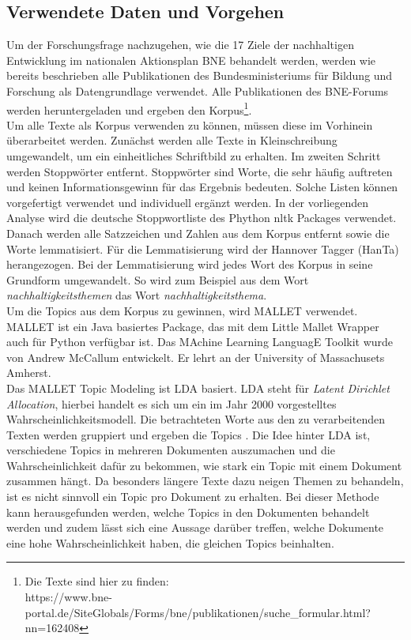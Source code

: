 \documentclass[letterpaper]{article}
\begin{document}
\subsection{Verwendete Daten und Vorgehen}
Um der Forschungsfrage nachzugehen, wie die 17 Ziele der nachhaltigen Entwicklung im nationalen Aktionsplan BNE behandelt werden, werden wie bereits beschrieben alle Publikationen des Bundesministeriums für Bildung und Forschung als Datengrundlage verwendet. Alle Publikationen des BNE-Forums werden heruntergeladen und ergeben den Korpus\footnote{Die Texte sind hier zu finden: \\ https://www.bne-portal.de/SiteGlobals/Forms/bne/publikationen/suche\_formular.html?nn=162408}.\\
Um alle Texte als Korpus verwenden zu können, müssen diese im Vorhinein überarbeitet werden. Zunächst werden alle Texte in Kleinschreibung umgewandelt, um ein einheitliches Schriftbild zu erhalten. Im zweiten Schritt werden Stoppwörter entfernt. Stoppwörter sind Worte, die sehr häufig auftreten und keinen Informationsgewinn für das Ergebnis bedeuten. Solche Listen können vorgefertigt verwendet und individuell ergänzt werden. In der vorliegenden Analyse wird die deutsche Stoppwortliste des Phython nltk Packages verwendet. 
Danach werden alle Satzzeichen und Zahlen aus dem Korpus entfernt sowie die Worte lemmatisiert. Für die Lemmatisierung wird der Hannover Tagger (HanTa)\cite{HanTa} herangezogen. Bei der Lemmatisierung wird jedes Wort des Korpus in seine Grundform umgewandelt. So wird zum Beispiel aus dem Wort \textit{nachhaltigkeitsthemen} das Wort \textit{nachhaltigkeitsthema}.\\
Um die Topics aus dem Korpus zu gewinnen, wird MALLET verwendet. MALLET ist ein Java basiertes Package, das mit dem Little Mallet Wrapper auch für Python verfügbar ist. Das MAchine Learning LanguagE Toolkit wurde von Andrew McCallum entwickelt. Er lehrt an der University of Massachusets Amherst\cite{MALLET}\cite{MALLET_WELSH}.\\
Das MALLET Topic Modeling ist LDA basiert. LDA steht für \textit{Latent Dirichlet Allocation}, hierbei handelt es sich um ein im Jahr 2000 vorgestelltes Wahrscheinlichkeitsmodell. Die betrachteten Worte aus den zu verarbeitenden Texten werden gruppiert und ergeben die Topics \cite{LDA}. Die Idee hinter LDA ist, verschiedene Topics in mehreren Dokumenten auszumachen und die Wahrscheinlichkeit dafür zu bekommen, wie stark ein Topic mit einem Dokument zusammen hängt. Da besonders längere Texte dazu neigen Themen zu behandeln, ist es nicht sinnvoll ein Topic pro Dokument zu erhalten. Bei dieser Methode kann herausgefunden werden, welche Topics in den Dokumenten behandelt werden und zudem lässt sich eine Aussage darüber treffen, welche Dokumente eine hohe Wahrscheinlichkeit haben, die gleichen Topics beinhalten\cite{LDAorig}. \\
\end{document}
